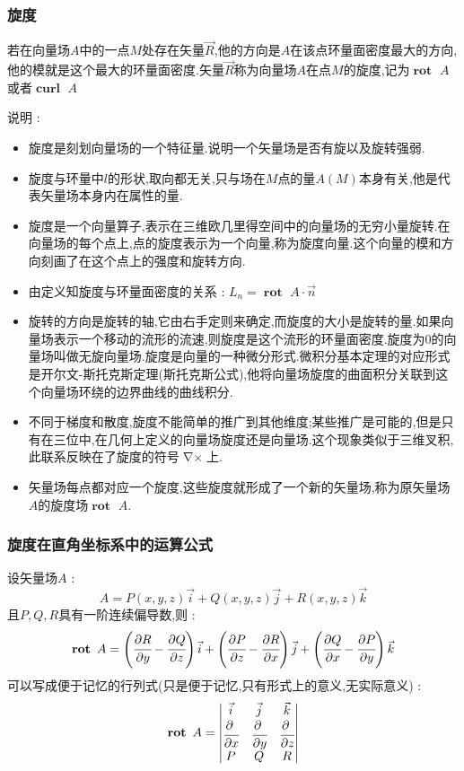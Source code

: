 \documentclass[UTF8,12pt]{ctexbook}
\newcommand{\bigCase}[1]{\left(#1\right)}
\newcommand{\partialDerivativeFrac}[2]{\cfrac{\partial #1}{\partial #2}}
\DeclareMathOperator{\curlSymbol}{\nabla\times}
\DeclareMathOperator{\curlText}{\mathbf{curl}\ }
\DeclareMathOperator{\curlRotText}{\mathbf{rot}\ }
\begin{document}
{{{{    \subsubsection{旋度}{
      若在向量场$A$中的一点$M$处存在矢量$\vec{R}$,他的方向是$A$在该点环量面密度最大的方向,他的模就是这个最大的环量面密度.矢量$\vec{R}$称为向量场$A$在点$M$的旋度,记为$\curlRotText A$或者$\curlText A$

      说明 :
      \begin{itemize}
        \item 旋度是刻划向量场的一个特征量.说明一个矢量场是否有旋以及旋转强弱.
        \item 旋度与环量中$l$的形状,取向都无关,只与场在$M$点的量$A(M)$本身有关,他是代表矢量场本身内在属性的量.
        \item 旋度是一个向量算子,表示在三维欧几里得空间中的向量场的无穷小量旋转.在向量场的每个点上,点的旋度表示为一个向量,称为旋度向量.这个向量的模和方向刻画了在这个点上的强度和旋转方向.
        \item 由定义知旋度与环量面密度的关系 : $L_n = \curlRotText A \cdot \vec{n}$
        \item 旋转的方向是旋转的轴,它由右手定则来确定,而旋度的大小是旋转的量.如果向量场表示一个移动的流形的流速,则旋度是这个流形的环量面密度.旋度为0的向量场叫做无旋向量场.旋度是向量的一种微分形式.微积分基本定理的对应形式是开尔文-斯托克斯定理(斯托克斯公式),他将向量场旋度的曲面积分关联到这个向量场环绕的边界曲线的曲线积分.
        \item 不同于梯度和散度,旋度不能简单的推广到其他维度;某些推广是可能的,但是只有在三位中,在几何上定义的向量场旋度还是向量场.这个现象类似于三维叉积,此联系反映在了旋度的符号$\curlSymbol$上.
        \item 矢量场每点都对应一个旋度,这些旋度就形成了一个新的矢量场,称为原矢量场$A$的旋度场$\curlRotText A$.
      \end{itemize}
    }%

    \subsubsection{旋度在直角坐标系中的运算公式}{
      设矢量场$A$ : $$
        A = P(x,y,z)\vec{i} + Q(x,y,z)\vec{j} + R(x,y,z)\vec{k}
      $$
      且$P,Q,R$具有一阶连续偏导数,则 : $$
        \curlRotText A = \bigCase{\partialDerivativeFrac{R}{y} - \partialDerivativeFrac{Q}{z}}\vec{i} + \bigCase{\partialDerivativeFrac{P}{z} - \partialDerivativeFrac{R}{x}}\vec{j} + \bigCase{\partialDerivativeFrac{Q}{x} - \partialDerivativeFrac{P}{y}}\vec{k}
      $$
      可以写成便于记忆的行列式(只是便于记忆,只有形式上的意义,无实际意义) : $$
        \curlRotText A = \begin{vmatrix}
          \vec{i}                       & \vec{j}                       & \vec{k}                       \\
          \partialDerivativeFrac{\ }{x} & \partialDerivativeFrac{\ }{y} & \partialDerivativeFrac{\ }{z} \\
          P                             & Q                             & R
        \end{vmatrix}
      $$
    }%

}}}}
\end{document}
